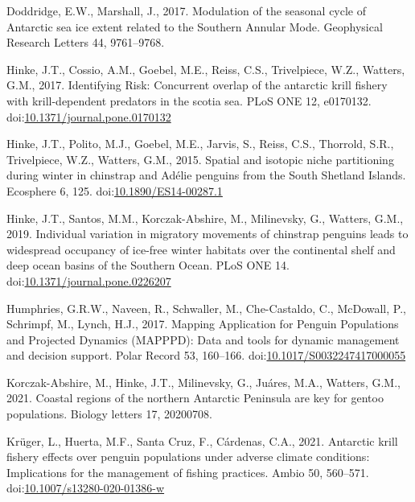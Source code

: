 \documentclass[]{elsarticle} %
\begin{document}
\leavevmode\hypertarget{ref-doddridgeModulationSeasonalCycle2017}{}%
Doddridge, E.W., Marshall, J., 2017. Modulation of the seasonal cycle of
Antarctic sea ice extent related to the Southern Annular Mode.
Geophysical Research Letters 44, 9761--9768.

\leavevmode\hypertarget{ref-Hinke2017}{}%
Hinke, J.T., Cossio, A.M., Goebel, M.E., Reiss, C.S., Trivelpiece, W.Z.,
Watters, G.M., 2017. Identifying Risk: Concurrent overlap of the
antarctic krill fishery with krill-dependent predators in the scotia
sea. PLoS ONE 12, e0170132.
doi:\href{https://doi.org/10.1371/journal.pone.0170132}{10.1371/journal.pone.0170132}

\leavevmode\hypertarget{ref-Hinke2015}{}%
Hinke, J.T., Polito, M.J., Goebel, M.E., Jarvis, S., Reiss, C.S.,
Thorrold, S.R., Trivelpiece, W.Z., Watters, G.M., 2015. Spatial and
isotopic niche partitioning during winter in chinstrap and Adélie
penguins from the South Shetland Islands. Ecosphere 6, 125.
doi:\href{https://doi.org/10.1890/ES14-00287.1}{10.1890/ES14-00287.1}

\leavevmode\hypertarget{ref-Hinke2019}{}%
Hinke, J.T., Santos, M.M., Korczak-Abshire, M., Milinevsky, G., Watters,
G.M., 2019. Individual variation in migratory movements of chinstrap
penguins leads to widespread occupancy of ice-free winter habitats over
the continental shelf and deep ocean basins of the Southern Ocean. PLoS
ONE 14.
doi:\href{https://doi.org/10.1371/journal.pone.0226207}{10.1371/journal.pone.0226207}

\leavevmode\hypertarget{ref-Humphries2017}{}%
Humphries, G.R.W., Naveen, R., Schwaller, M., Che-Castaldo, C.,
McDowall, P., Schrimpf, M., Lynch, H.J., 2017. Mapping Application for
Penguin Populations and Projected Dynamics (MAPPPD): Data and tools for
dynamic management and decision support. Polar Record 53, 160--166.
doi:\href{https://doi.org/10.1017/S0032247417000055}{10.1017/S0032247417000055}

\leavevmode\hypertarget{ref-korczak-abshireCoastalRegionsNorthern2021}{}%
Korczak-Abshire, M., Hinke, J.T., Milinevsky, G., Juáres, M.A., Watters,
G.M., 2021. Coastal regions of the northern Antarctic Peninsula are key
for gentoo populations. Biology letters 17, 20200708.

\leavevmode\hypertarget{ref-Kruger2021}{}%
Krüger, L., Huerta, M.F., Santa Cruz, F., Cárdenas, C.A., 2021.
Antarctic krill fishery effects over penguin populations under adverse
climate conditions: Implications for the management of fishing
practices. Ambio 50, 560--571.
doi:\href{https://doi.org/10.1007/s13280-020-01386-w}{10.1007/s13280-020-01386-w}
\end{document}
